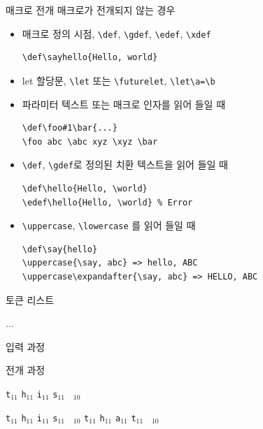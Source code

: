 \documentclass{beamer}
\begin{document}
%
\begin{frame}[fragile]{매크로 전개}
  매크로가 전개되지 않는 경우
  \begin{itemize}
  \item 매크로 정의 시점, \verb+\def+, \verb+\gdef+, \verb+\edef+, \verb+\xdef+
\begin{Verbatim}[fontsize=\small, formatcom=\color{blue}]
\def\sayhello{Hello, world}
\end{Verbatim}
  \item let 할당문, \verb+\let+ 또는 \verb+\futurelet+,
  {\color{blue} \verb+\let\a=\b+}
  \item 파라미터 텍스트 또는 매크로 인자를 읽어 들일 때
\begin{Verbatim}[fontsize=\small, formatcom=\color{blue}]
\def\foo#1\bar{...}
\foo abc \abc xyz \xyz \bar
\end{Verbatim}
  \item \verb+\def+, \verb+\gdef+로 정의된 치환 텍스트을 읽어 들일 때
\begin{Verbatim}[fontsize=\small, formatcom=\color{blue}] 
\def\hello{Hello, \world}
\edef\hello{Hello, \world} % Error
\end{Verbatim}
  \item \verb+\uppercase+, \verb+\lowercase+ 를 읽어 들일 때
\begin{Verbatim}[fontsize=\small, formatcom=\color{blue}]
\def\say{hello}
\uppercase{\say, abc} => hello, ABC
\uppercase\expandafter{\say, abc} => HELLO, ABC  
\end{Verbatim}
  \end{itemize}
\end{frame}


%
\begin{frame}[fragile]{토큰 리스트}
  \begin{Verbatim*}
\def\tokentwo{\iftrue this \else that \fi}
\def\tokenone#1{...}
...
\expandafter\tokenone\tokentwo
  \end{Verbatim*}
  \bigskip

  \alert{입력 과정}
  
  \quad
  \quad
  
  \bigskip
  \alert{전개 과정}
  
  \quad
  \verb|t|$_{11}$\quad
  \verb|h|$_{11}$\quad
  \verb|i|$_{11}$\quad
  \verb|s|$_{11}$\quad
  \verb*| |$_{10}$
  
  \bigskip
  \quad
  \quad
  \verb|t|$_{11}$\quad
  \verb|h|$_{11}$\quad
  \verb|i|$_{11}$\quad
  \verb|s|$_{11}$\quad
  \verb*| |$_{10}$\quad
  \quad
  \verb|t|$_{11}$\quad
  \verb|h|$_{11}$\quad
  \verb|a|$_{11}$\quad
  \verb|t|$_{11}$\quad
  \verb*| |$_{10}$\quad
\end{frame}
\end{document}
